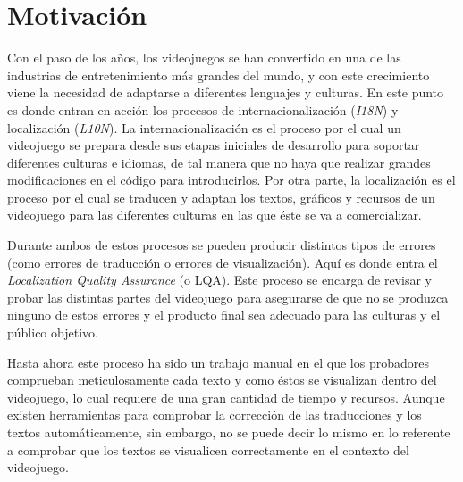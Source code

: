 

\section{Motivación}
Con el paso de los años, los videojuegos se han convertido en una de las industrias de entretenimiento más grandes del mundo, y con este crecimiento viene la necesidad de adaptarse a diferentes lenguajes y culturas.
En este punto es donde entran en acción los procesos de internacionalización ({\textit{I18N}}) y localización ({\textit{L10N}}).\cite{LQAPSM2017}
La internacionalización es el proceso por el cual un videojuego se prepara desde sus etapas iniciales de desarrollo para soportar diferentes culturas e idiomas, de tal manera que no haya que realizar grandes modificaciones en el código para introducirlos.
Por otra parte, la localización es el proceso por el cual se traducen y adaptan los textos, gráficos y recursos de un videojuego para las diferentes culturas en las que éste se va a comercializar.

Durante ambos de estos procesos se pueden producir distintos tipos de errores (como errores de traducción o errores de visualización). Aquí es donde entra el \textit{Localization Quality Assurance} (o LQA). Este proceso se encarga de revisar y probar las distintas partes del videojuego para asegurarse de que no se produzca ninguno de estos errores y el producto final sea adecuado para las culturas y el público objetivo.

Hasta ahora este proceso ha sido un trabajo manual en el que los probadores comprueban meticulosamente cada texto y como éstos se visualizan dentro del videojuego, lo cual requiere de una gran cantidad de tiempo y recursos. Aunque existen herramientas para comprobar la corrección de las traducciones y los textos automáticamente, sin embargo, no se puede decir lo mismo en lo referente a comprobar que los textos se visualicen correctamente en el contexto del videojuego.


